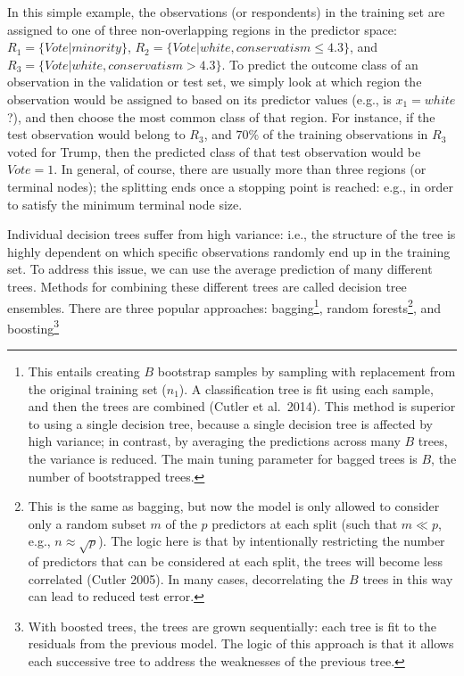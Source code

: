 \documentclass{book}
\begin{document}
In this simple example, the observations (or respondents) in the training set
are assigned to one of three non-overlapping regions in the predictor space:
\({R_{1}= \{Vote \vert minority}\}\),
\(R_{2} = \{Vote \vert white, conservatism \leq 4.3\}\), and
\(R_{3}= \{Vote \vert white, conservatism > 4.3 \}\). To predict the outcome
class of an observation in the validation or test set, we simply look at which
region the observation would be assigned to based on its predictor values
(e.g., is \(x_{1} = white\)?), and then choose the most common class of that
region. For instance, if the test observation would belong to \(R_{3}\), and
\(70\%\) of the training observations in \(R_{3}\) voted for Trump, then the
predicted class of that test observation would be \(Vote=1\). In general, of
course, there are usually more than three regions (or terminal nodes); the
splitting ends once a stopping point is reached: e.g., in order to satisfy the
minimum terminal node size.

Individual decision trees suffer from high variance: i.e., the structure of
the tree is highly dependent on which specific observations randomly end up in
the training set. To address this issue, we can use the average prediction of
many different trees. Methods for combining these different trees are called
decision tree ensembles. There are three popular approaches:
bagging\footnote{This entails creating \(B\) bootstrap samples by sampling
  with replacement from the original training set (\(n_{1}\)). A
  classification tree is fit using each sample, and then the trees are
  combined (Cutler et al.~2014). This method is superior to using a single
  decision tree, because a single decision tree is affected by high variance;
  in contrast, by averaging the predictions across many \(B\) trees, the
  variance is reduced. The main tuning parameter for bagged trees is \(B\),
  the number of bootstrapped trees.}, random forests\footnote{This is the same
  as bagging, but now the model is only allowed to consider only a random
  subset \(m\) of the \(p\) predictors at each split (such that \(m \ll p\),
  e.g., \(n \approx \sqrt{p}\)). The logic here is that by intentionally
  restricting the number of predictors that can be considered at each split,
  the trees will become less correlated (Cutler 2005). In many cases,
  decorrelating the \(B\) trees in this way can lead to reduced test error.},
and boosting\footnote{With boosted trees, the trees are grown sequentially:
  each tree is fit to the residuals from the previous model. The logic of this
  approach is that it allows each successive tree to address the weaknesses of
  the previous tree.}
\end{document}
